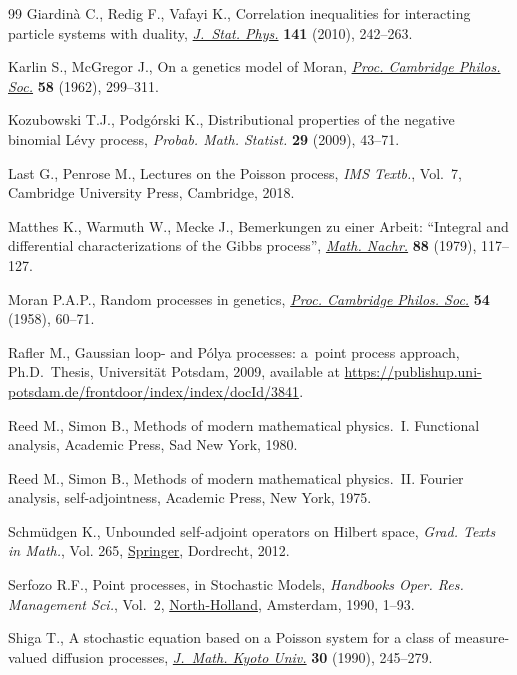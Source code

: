 \documentclass[11pt]{article}
\numberwithin{equation}{section}
\numberwithin{equation}{section}
\newcommand{\1}{\mathbbm{1}}
\begin{document}
\begin{thebibliography}{99}
Giardin\`a C., Redig F., Vafayi K., Correlation inequalities for interacting
 particle systems with duality, \href{https://doi.org/10.1007/s10955-010-0055-0}{\textit{J.~Stat. Phys.}} \textbf{141} (2010),
 242--263.

Karlin S., McGregor J., On a genetics model of {M}oran, \href{https://doi.org/10.1017/S0305004100036513}{\textit{Proc. Cambridge
 Philos. Soc.}} \textbf{58} (1962), 299--311.

Kozubowski T.J., Podg\'orski K., Distributional properties of the negative
 binomial {L}\'evy process, \textit{Probab. Math. Statist.} \textbf{29}
 (2009), 43--71.

Last G., Penrose M., Lectures on the {P}oisson process, \textit{IMS Textb.},
 Vol.~7, Cambridge University Press, Cambridge, 2018.

Matthes K., Warmuth W., Mecke J., Bemerkungen zu einer {A}rbeit: ``{I}ntegral
 and differential characterizations of the {G}ibbs process'', \href{https://doi.org/10.1002/mana.19790880110}{\textit{Math.
 Nachr.}} \textbf{88} (1979), 117--127.

Moran P.A.P., Random processes in genetics, \href{https://doi.org/10.1017/s0305004100033193}{\textit{Proc. Cambridge Philos.
 Soc.}} \textbf{54} (1958), 60--71.

Rafler M., Gaussian loop- and {P}\'olya processes: a~point process approach,
 Ph.D.~Thesis, {U}niversit\"at {P}otsdam, 2009, available at
 \url{https://publishup.uni-potsdam.de/frontdoor/index/index/docId/3841}.

Reed M., Simon B., Methods of modern mathematical physics.~{I}. Functional
 analysis, Academic Press, Sad New York, 1980.

Reed M., Simon B., Methods of modern mathematical physics.~{II}. {F}ourier
 analysis, self-adjointness, Academic Press, New York, 1975.

Schm\"udgen K., Unbounded self-adjoint operators on Hilbert space,
 \textit{Grad. Texts in Math.}, Vol. 265, \href{https://doi.org/10.1007/978-94-007-4753-1}{Springer}, Dordrecht, 2012.

Serfozo R.F., Point processes, in Stochastic Models, \textit{Handbooks Oper.
 Res. Management Sci.}, Vol.~2, \href{https://doi.org/10.1016/S0927-0507(05)80165-3}{North-Holland}, Amsterdam, 1990, 1--93.

Shiga T., A stochastic equation based on a {P}oisson system for a class of
 measure-valued diffusion processes, \href{https://doi.org/10.1215/kjm/1250520071}{\textit{J.~Math. Kyoto Univ.}} \textbf{30}
 (1990), 245--279.

\end{thebibliography}
\end{document}

